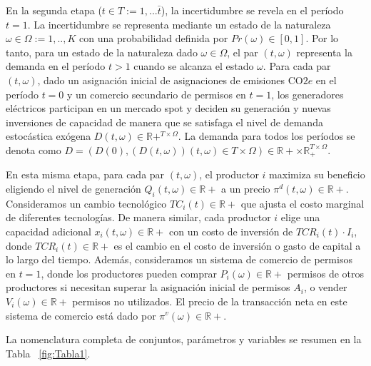 En la segunda etapa ($t\in T:={1,...\bar{t}}$), la incertidumbre se revela en el período $t=1$. La incertidumbre se representa mediante un estado de la naturaleza $\omega\in\Omega:={1,..,K}$ con una probabilidad definida por $Pr(\omega)\in[0,1]$. Por lo tanto, para un estado de la naturaleza dado $\omega\in\Omega$, el par $(t,\omega)$ representa la demanda en el período $t>1$ cuando se alcanza el estado $\omega$. Para cada par $(t,\omega)$, dado un asignación inicial de asignaciones de emisiones CO$2e$ en el período $t=0$ y un comercio secundario de permisos en $t=1$, los generadores eléctricos participan en un mercado spot y deciden su generación y nuevas inversiones de capacidad de manera que se satisfaga el nivel de demanda estocástica exógena $D(t,\omega)\in\mathbb{R}+^{T\times\Omega}$. La demanda para todos los períodos se denota como $D=\left(D(0),(D(t,\omega)){(t,\omega)\in T\times\Omega}\right)\in\mathbb{R}+\times\mathbb{R}_+^{T\times\Omega}$.
\vspace{2.5mm}

En esta misma etapa, para cada par $(t,\omega)$, el productor $i$ maximiza su beneficio eligiendo el nivel de generación $Q_i(t,\omega)\in\mathbb{R}+$ a un precio $\pi^d(t,\omega)\in\mathbb{R}+$. Consideramos un cambio tecnológico $TC_i(t) \in\mathbb{R}+$ que ajusta el costo marginal de diferentes tecnologías. De manera similar, cada productor $i$ elige una capacidad adicional $x_i(t,\omega)\in\mathbb{R}+$ con un costo de inversión de $TCR_i(t)\cdot I_i$, donde $TCR_i(t)\in\mathbb{R}+$ es el cambio en el costo de inversión o gasto de capital a lo largo del tiempo. Además, consideramos un sistema de comercio de permisos en $t=1$, donde los productores pueden comprar $P_i(\omega)\in\mathbb{R}+$ permisos de otros productores si necesitan superar la asignación inicial de permisos $A_i$, o vender $V_i(\omega)\in\mathbb{R}+$ permisos no utilizados. El precio de la transacción neta en este sistema de comercio está dado por $\pi^v(\omega)\in\mathbb{R}+$.
\vspace{2.5mm}

La nomenclatura completa de conjuntos, parámetros y variables se resumen en la Tabla ~\ref{fig:Tabla1}. 

